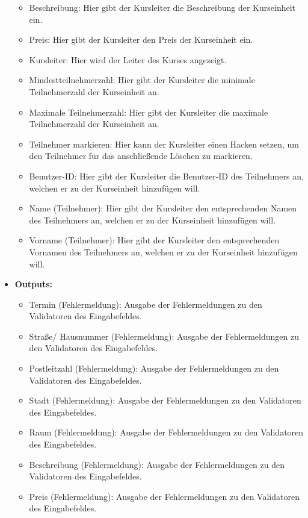 \begin{itemize}
\begin{itemize}
								\item Beschreibung: Hier gibt der Kursleiter die Beschreibung der Kurseinheit ein.
								\item Preis: Hier gibt der Kursleiter den Preis der Kurseinheit ein.
								\item Kursleiter: Hier wird der Leiter des Kurses angezeigt.
								\item Mindestteilnehmerzahl: Hier gibt der Kursleiter die minimale Teilnehmerzahl der Kurseinheit an.
								\item Maximale Teilnehmerzahl: Hier gibt der Kursleiter die maximale Teilnehmerzahl der Kurseinheit an.
								\item Teilnehmer markieren: Hier kann der Kursleiter einen Hacken setzen, um den Teilnehmer für das anschließende Löschen zu markieren.
								\item Benutzer-ID: Hier gibt der Kursleiter die Benutzer-ID des Teilnehmers an, welchen er zu der Kurseinheit hinzufügen will.
								\item Name (Teilnehmer): Hier gibt der Kursleiter den entsprechenden Namen des Teilnehmers an, welchen er zu der Kurseinheit hinzufügen will.
								\item Vorname (Teilnehmer): Hier gibt der Kursleiter den entsprechenden Vornamen des Teilnehmers an, welchen er zu der Kurseinheit hinzufügen will.
							\end{itemize}
						\item \textbf{Outputs:}
							\begin{itemize}
								\item Termin (Fehlermeldung): Ausgabe der Fehlermeldungen zu den Validatoren des Eingabefeldes.
								\item Straße/ Hausnummer (Fehlermeldung): Ausgabe der Fehlermeldungen zu den Validatoren des Eingabefeldes.
								\item Postleitzahl (Fehlermeldung): Ausgabe der Fehlermeldungen zu den Validatoren des Eingabefeldes.
								\item Stadt (Fehlermeldung): Ausgabe der Fehlermeldungen zu den Validatoren des Eingabefeldes.
								\item Raum (Fehlermeldung): Ausgabe der Fehlermeldungen zu den Validatoren des Eingabefeldes.
								\item Beschreibung (Fehlermeldung): Ausgabe der Fehlermeldungen zu den Validatoren des Eingabefeldes.
								\item Preis (Fehlermeldung): Ausgabe der Fehlermeldungen zu den Validatoren des Eingabefeldes.

\end{itemize}
\end{itemize}
